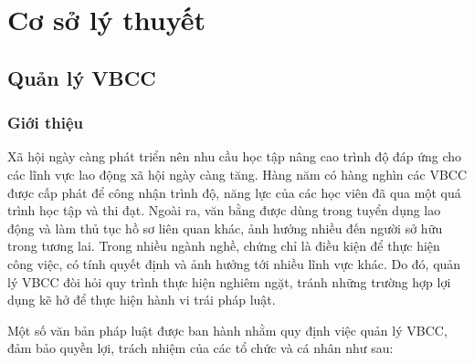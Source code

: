 \chapter{Cơ sở lý thuyết}
\section{Quản lý VBCC}
\subsection{Giới thiệu}

Xã hội ngày càng phát triển nên nhu cầu học tập nâng cao trình độ đáp ứng cho các lĩnh vực lao động xã hội ngày càng tăng.
Hàng năm có hàng nghìn các VBCC được cấp phát để công nhận trình độ, năng lực của các học viên đã qua một quá trình học tập và thi đạt.
Ngoài ra, văn bằng được dùng trong tuyển dụng lao động và làm thủ tục hồ sơ liên quan khác, ảnh hưởng nhiều đến người sở hữu trong tương lai.
Trong nhiều ngành nghề, chứng chỉ là điều kiện để thực hiện công việc, có tính quyết định và ảnh hưởng tới nhiều lĩnh vực khác.
Do đó, quản lý VBCC đòi hỏi quy trình thực hiện nghiêm ngặt, tránh những trường hợp lợi dụng kẽ hở để thực hiện hành vi trái pháp luật.

Một số văn bản pháp luật được ban hành nhằm quy định việc quản lý VBCC, đảm bảo quyền lợi, trách nhiệm của các tổ chức và cá nhân như sau:

